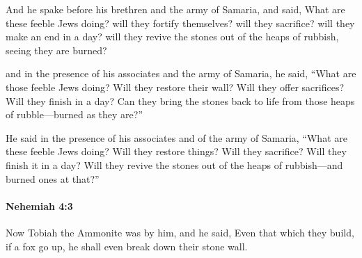 			\begin{versebox}
					\item[BHS] 
					\item[LXX] 
					\item[ASV] And he spake before his brethren and the army of Samaria, and said, What are these feeble Jews doing? will they fortify themselves? will they sacrifice? will they make an end in a day? will they revive the stones out of the heaps of rubbish, seeing they are burned?
					\item[NIV] and in the presence of his associates and the army of Samaria, he said, “What are those feeble Jews doing? Will they restore their wall? Will they offer sacrifices? Will they finish in a day? Can they bring the stones back to life from those heaps of rubble—burned as they are?”
					\item[NRSV] He said in the presence of his associates and of the army of Samaria, “What are these feeble Jews doing? Will they restore things? Will they sacrifice? Will they finish it in a day? Will they revive the stones out of the heaps of rubbish—and burned ones at that?”
			\end{versebox}

		\paragraph{Nehemiah 4:3} %
			\label{NEHEMIAH-4-3}

			Now Tobiah the Ammonite was by him, and he said, Even that which they build, if a fox go up, he shall even break down their stone wall.

